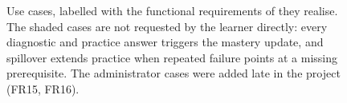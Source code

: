 \begin{figure}[htbp]
  \caption[Use cases mapped to functional requirements]{Use cases, labelled with the functional requirements of
     they realise. The shaded cases are not requested by
    the learner directly: every diagnostic and practice answer triggers the
    mastery update, and spillover extends practice when repeated failure points
    at a missing prerequisite. The administrator cases were added late in the
    project (FR15, FR16).}
  \label{fig:use-cases}
\end{figure}
